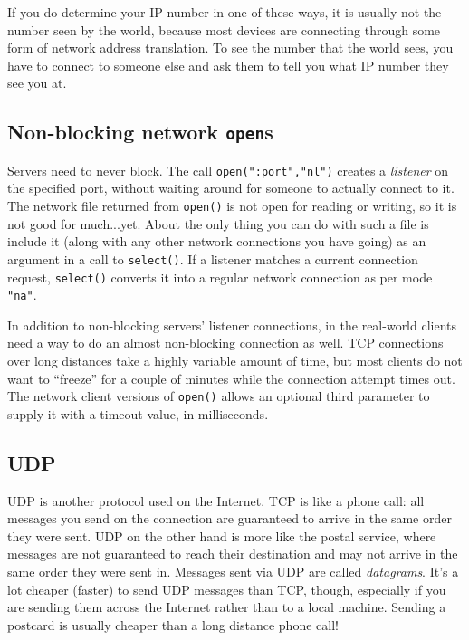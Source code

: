 If you do determine your IP number in one of these ways, it is usually not the
number seen by the world, because most devices are connecting through some form
of network address translation.  To see the number that the world sees, you have
to connect to someone else and ask them to tell you what IP number they see you
at.


\subsection{Non-blocking network \texttt{open}s}

Servers need to never block. The call
\texttt{open(":port","nl")}
creates a \textit{listener} on the specified port, without waiting around for
someone to actually connect to it. The network file returned from
\texttt{open()} is not open for reading or writing, so it is not good for
much...yet. About the only thing you can do with such a file is include it
(along with any other network connections you have going) as an argument in a
call to \texttt{select()}. If a listener matches a current connection request,
\texttt{select()} converts it into a regular network connection as per mode
\texttt{"na"}.

In addition to non-blocking servers' listener connections, in the real-world
clients need a way to do an almost non-blocking connection as well.
TCP connections over long distances take a highly variable amount of time,
but most clients do not want to ``freeze'' for a couple of minutes while
the connection attempt times out. The network client versions of \texttt{open()}
allows an optional third parameter to supply it with a timeout value,
in milliseconds.

\subsection{UDP}

UDP is another protocol used on the Internet. TCP is like a
phone call: all messages you send on the connection are guaranteed to
arrive in the same order they were sent. UDP on the other hand is more
like the postal service, where messages are not guaranteed to reach
their destination and may not arrive in the same order they were sent
in. Messages sent via UDP are called \textit{datagrams}.
It's a lot cheaper (faster) to send UDP messages than
TCP, though, especially if you are sending them across the Internet
rather than to a local machine. Sending a postcard is usually cheaper
than a long distance phone call!

